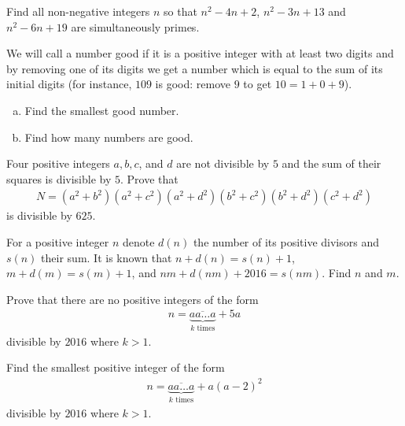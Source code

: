 \begin{problem}
	Find all non-negative integers $n$ so that $n^2 - 4n + 2$, $n^2 - 3n + 13$ and $n^2 - 6n + 19$ are simultaneously primes.
\end{problem}

\begin{problem}
	We will call a number good if it is a positive integer with at least two digits and by removing one of its digits we get a number which is equal to the sum of its initial digits (for instance, $109$ is good: remove $9$ to get $10 = 1 + 0 + 9$).
	\begin{enumerate}[(a)]
		\item Find the smallest good number.
		\item Find how many numbers are good.
	\end{enumerate}
\end{problem}

\begin{problem}
	Four positive integers $a, b, c$, and $d$ are not divisible by $5$ and the sum of their squares is divisible by $5$. Prove that
	\begin{align*}
		N = (a^2 + b^2)(a^2 + c^2)(a^2 + d^2)(b^2 + c^2)(b^2 + d^2)(c^2 + d^2)
	\end{align*}
	is divisible by $625$.
\end{problem}

\begin{problem}
	For a positive integer $n$ denote $d(n)$ the number of its positive divisors and $s(n)$ their sum. It is known that $n + d(n) = s(n) + 1$, $m + d(m) = s(m) + 1$, and $nm + d(nm) + 2016 = s(nm)$. Find $n$ and $m$.
\end{problem}

\begin{problem}
	Prove that there are no positive integers of the form
		\begin{align*}
			n = \underbrace{\overline{aa\dots a}}_{k\text{ times}} + 5a
		\end{align*}
	divisible by $2016$ where $k>1$.
\end{problem}

\begin{problem}
	Find the smallest positive integer of the form
		\begin{align*}
			n = \underbrace{\overline{aa\dots a}}_{k\text{ times}} + a(a-2)^2
		\end{align*}
	divisible by $2016$ where $k>1$.
\end{problem}

